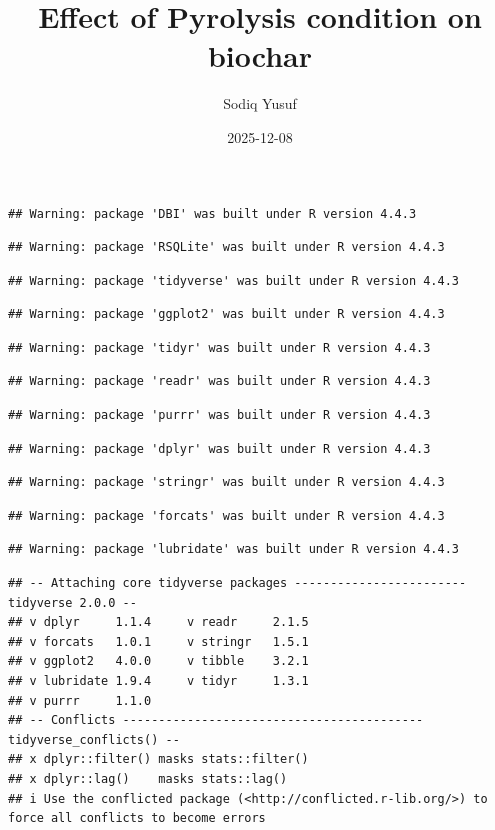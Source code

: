 \documentclass[
]{article}
\title{Effect of Pyrolysis condition on biochar}
\author{Sodiq Yusuf}
\date{2025-12-08}
\begin{document}
\maketitle

\begin{verbatim}
## Warning: package 'DBI' was built under R version 4.4.3
\end{verbatim}

\begin{verbatim}
## Warning: package 'RSQLite' was built under R version 4.4.3
\end{verbatim}

\begin{verbatim}
## Warning: package 'tidyverse' was built under R version 4.4.3
\end{verbatim}

\begin{verbatim}
## Warning: package 'ggplot2' was built under R version 4.4.3
\end{verbatim}

\begin{verbatim}
## Warning: package 'tidyr' was built under R version 4.4.3
\end{verbatim}

\begin{verbatim}
## Warning: package 'readr' was built under R version 4.4.3
\end{verbatim}

\begin{verbatim}
## Warning: package 'purrr' was built under R version 4.4.3
\end{verbatim}

\begin{verbatim}
## Warning: package 'dplyr' was built under R version 4.4.3
\end{verbatim}

\begin{verbatim}
## Warning: package 'stringr' was built under R version 4.4.3
\end{verbatim}

\begin{verbatim}
## Warning: package 'forcats' was built under R version 4.4.3
\end{verbatim}

\begin{verbatim}
## Warning: package 'lubridate' was built under R version 4.4.3
\end{verbatim}

\begin{verbatim}
## -- Attaching core tidyverse packages ------------------------ tidyverse 2.0.0 --
## v dplyr     1.1.4     v readr     2.1.5
## v forcats   1.0.1     v stringr   1.5.1
## v ggplot2   4.0.0     v tibble    3.2.1
## v lubridate 1.9.4     v tidyr     1.3.1
## v purrr     1.1.0     
## -- Conflicts ------------------------------------------ tidyverse_conflicts() --
## x dplyr::filter() masks stats::filter()
## x dplyr::lag()    masks stats::lag()
## i Use the conflicted package (<http://conflicted.r-lib.org/>) to force all conflicts to become errors
\end{verbatim}
\end{document}
